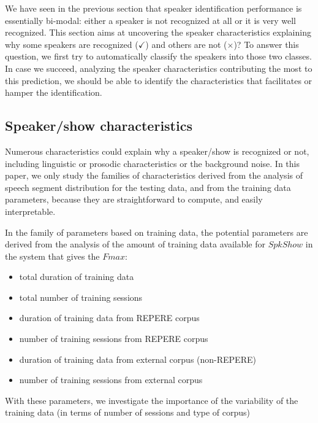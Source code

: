 We have seen in the previous section that speaker identification performance is essentially bi-modal: either a speaker is not recognized at all or it is very well recognized. This section aims at uncovering the speaker characteristics explaining why some speakers are recognized ($\checkmark$) and others are not ($\times$)? To answer this question, we first try to automatically classify the speakers into those two classes. In case we succeed, analyzing the speaker characteristics contributing the most to this prediction, we should be able to identify the characteristics that facilitates or hamper the identification.

\subsection{Speaker/show characteristics}

Numerous characteristics could explain why a speaker/show is recognized or not, including linguistic or prosodic characteristics or the background noise. In this paper, we only study the families of characteristics derived from the analysis of speech segment distribution for the testing data, and from the training data parameters, because they are straightforward to compute, and easily interpretable.

In the family of parameters based on training data, the potential parameters are derived from the analysis of the amount of  training data available for $SpkShow$ in the system that gives the $Fmax$:
\begin{itemize}
\item total duration of training data
\item total number of training sessions
\item duration of training data from REPERE corpus
\item number of training sessions from REPERE corpus
\item duration of training data from external corpus (non-REPERE)
\item number of training sessions from external corpus
\end{itemize}
With these parameters, we investigate the importance of the variability of the training data (in terms of number of sessions and type of corpus)

